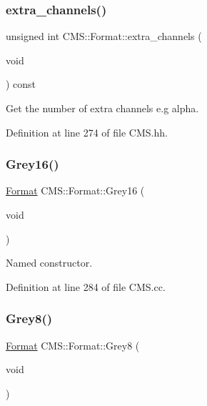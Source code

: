\subsubsection{\texorpdfstring{extra\+\_\+channels()}{extra\_channels()}}
{\footnotesize\ttfamily unsigned int C\+M\+S\+::\+Format\+::extra\+\_\+channels (\begin{DoxyParamCaption}\item[{void}]{ }\end{DoxyParamCaption}) const\hspace{0.3cm}{\ttfamily [inline]}}



Get the number of \textquotesingle{}extra\textquotesingle{} channels e.\+g alpha. 



Definition at line 274 of file C\+M\+S.\+hh.

\mbox{\label{class_c_m_s_1_1_format_a6df52d558cb752a1126f19d075fecb2f}} 
\subsubsection{\texorpdfstring{Grey16()}{Grey16()}}
{\footnotesize\ttfamily \hyperlink{class_c_m_s_1_1_format}{Format} C\+M\+S\+::\+Format\+::\+Grey16 (\begin{DoxyParamCaption}\item[{void}]{ }\end{DoxyParamCaption})\hspace{0.3cm}{\ttfamily [static]}}



Named constructor. 



Definition at line 284 of file C\+M\+S.\+cc.

\mbox{\label{class_c_m_s_1_1_format_ad48e99a1681174df84401f86506e7f15}} 
\subsubsection{\texorpdfstring{Grey8()}{Grey8()}}
{\footnotesize\ttfamily \hyperlink{class_c_m_s_1_1_format}{Format} C\+M\+S\+::\+Format\+::\+Grey8 (\begin{DoxyParamCaption}\item[{void}]{ }\end{DoxyParamCaption})\hspace{0.3cm}{\ttfamily [static]}}



